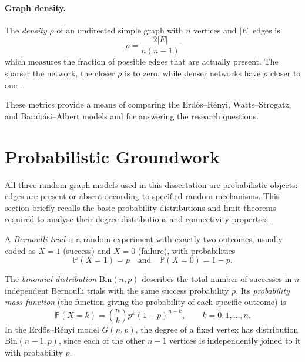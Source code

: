\documentclass[12pt, a4paper]{report}
\theoremstyle{definition}
\theoremstyle{plain}
\theoremstyle{remark}
\begin{document}
\paragraph{Graph density.}
The \emph{density} $\rho$ of an undirected simple graph 
with $n$ vertices and $|E|$ edges is
\begin{equation}
\rho = \frac{2|E|}{n(n-1)}
\label{eq:density}
\end{equation}
which measures the fraction of possible edges that are 
actually present. The sparser the network, the closer $\rho$ 
is to zero, while denser networks have $\rho$ closer to one
\cite{hofstad2017}.

These metrics provide a means of comparing the 
Erd\H{o}s--R\'enyi, Watts--Strogatz, and Barab\'asi--Albert 
models and for answering the research questions.

\section{Probabilistic Groundwork}
\label{sec:probability}

All three random graph models used in this dissertation are 
probabilistic objects: edges are present or absent according to 
specified random mechanisms. This section briefly recalls the 
basic probability distributions and limit theorems required to 
analyse their degree distributions and connectivity properties
\cite{hofstad2017, bollobas2001}.

A \emph{Bernoulli trial} is a random experiment with exactly two
outcomes, usually coded as $X = 1$ (success) and $X = 0$
(failure), with probabilities
\begin{equation}
\mathbb{P}(X = 1) = p
\quad\text{and}\quad
\mathbb{P}(X = 0) = 1 - p.
\label{eq:bernoulli}
\end{equation}

The \emph{binomial distribution} $\mathrm{Bin}(n,p)$ describes 
the total number of successes in $n$ independent Bernoulli
trials with the same success probability $p$. Its
\emph{probability mass function} (the function giving the
probability of each specific outcome) is
\begin{equation}
\mathbb{P}(X = k)
= \binom{n}{k} p^k (1-p)^{n-k},
\qquad k = 0,1,\dots,n.
\label{eq:pmf}
\end{equation}
In the Erd\H{o}s--R\'enyi model $G(n,p)$, the degree of a fixed 
vertex has distribution $\mathrm{Bin}(n-1,p)$, since each of the 
other $n-1$ vertices is independently joined to it with 
probability $p$.
\end{document}
